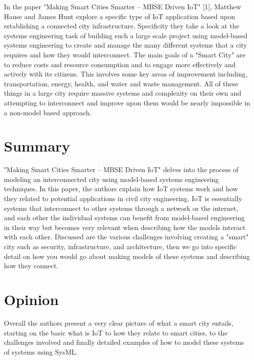 \documentclass[11pt]{asme2ej}
\begin{document}
In the paper "Making Smart Cities Smarter – MBSE Driven IoT" [1], Matthew Hause and James Hunt explore a specific type of IoT application based upon establishing a connected city infrastructure. 
Specificity they take a look at the systems engineering task of building such a large scale project using model-based systems engineering to create and manage the many different systems that a city requires and how they would interconnect.
The main goals of a "Smart City" are to reduce costs and resource consumption and to engage more effectively and actively with its citizens. This involves some key areas of improvement including, transportation, energy, health, and water and waste management.
All of these things in a large city require massive systems and complexity on their own and attempting to interconnect and improve upon them would be nearly impossible in a non-model based approach. 

\section{Summary}

"Making Smart Cities Smarter – MBSE Driven IoT" delves into the process of modeling an interconnected city using model-based systems engineering techniques. 
In this paper, the authors explain how IoT systems work and how they related to potential applications in civil city engineering.
IoT is essentially systems that interconnect to other systems through a network or the internet, and each other the individual systems can benefit from model-based engineering in their way but becomes very relevant when describing how the models interact with each other.
Discussed are the various challenges involving creating a "smart" city such as security, infrastructure, and architecture, then we go into specific detail on how you would go about making models of these systems and describing how they connect.


\section{Opinion}

Overall the authors present a very clear picture of what a smart city entails, starting on the basic what is IoT to how they relate to smart cities, to the challenges involved and finally detailed examples of how to model these systems of systems using SysML.\\
\end{document}
